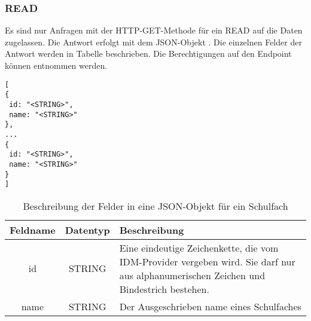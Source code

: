 \subsubsection{READ}
\label{sec:end:rest:api:school-subjects:read}
Es sind nur Anfragen mit der HTTP-GET-Methode für ein READ auf die Daten zugelassen.
Die Antwort erfolgt mit dem JSON-Objekt . Die einzelnen Felder der Antwort werden in Tabelle  beschrieben.
Die Berechtigungen auf den Endpoint können  entnommen werden.

\begin{lstlisting}[caption={JSON-Antwort für einen GET-Aufruf der Route /api/school-subjects},label={lst:code:end:rest:api:school-subjects:read:ret},frame=tlrb]
[
{
 id: "<STRING>",
 name: "<STRING>"
},
...
{
 id: "<STRING>",
 name: "<STRING>"
}
]
\end{lstlisting}
\begin{table}[htb]
	\begin{tabularx}{\textwidth}{|c|c|X|}
		\hline
			\textbf{Feldname} & \textbf{Datentyp} & \textbf{Beschreibung} \\ \hline
			id & STRING & Eine eindeutige Zeichenkette, die vom IDM-Provider vergeben wird. Sie darf nur aus alphanumerischen Zeichen und Bindestrich bestehen.\\ \hline
			name & STRING & Der Ausgeschrieben name eines Schulfaches \\ \hline
	\end{tabularx}

		\caption{Beschreibung der Felder in eine JSON-Objekt für ein Schulfach}
		\label{tab:end:rest:api:school-subjects:read:ret:json}
\end{table}
